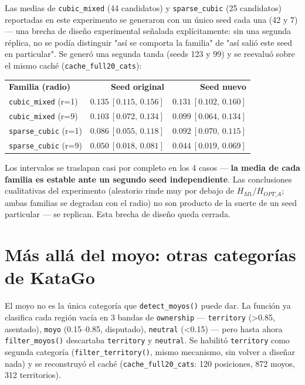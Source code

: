 \documentclass[11pt, a4paper]{article}
\newcommand{\TH}[1]{\cellcolor{cTHbg}\color{white}\textbf{#1}}
\begin{document}
Las medias de \texttt{cubic\_mixed} (44 candidatos) y
\texttt{sparse\_cubic} (25 candidatos) reportadas en este experimento
se generaron con un \'unico seed cada una (42 y 7) --- una brecha de
dise\~no experimental se\~nalada expl\'icitamente: sin una segunda
r\'eplica, no se pod\'ia distinguir "as\'i se comporta la familia" de
"as\'i sali\'o este seed en particular". Se gener\'o una segunda
tanda (seeds 123 y 99) y se reevalu\'o sobre el mismo cach\'e
(\texttt{cache\_full20\_cats}):

\medskip
\begin{center}
\begin{tabular}{lrr}
  \TH{Familia (radio)} & \TH{Seed original} & \TH{Seed nuevo} \\[1pt]
  \texttt{cubic\_mixed} (r=1)  & $0.135\ [0.115,\,0.156]$ & $0.131\ [0.102,\,0.160]$ \\
  \texttt{cubic\_mixed} (r=9)  & $0.103\ [0.072,\,0.134]$ & $0.099\ [0.064,\,0.134]$ \\
  \texttt{sparse\_cubic} (r=1) & $0.086\ [0.055,\,0.118]$ & $0.092\ [0.070,\,0.115]$ \\
  \texttt{sparse\_cubic} (r=9) & $0.050\ [0.018,\,0.081]$ & $0.044\ [0.019,\,0.069]$ \\
\end{tabular}
\end{center}
\medskip

\begin{tcolorbox}[quotebox]
  Los intervalos se traslapan casi por completo en los 4 casos ---
  \textbf{la media de cada familia es estable ante un segundo seed
  independiente}. Las conclusiones cualitativas del experimento
  (aleatorio rinde muy por debajo de $H_{M1}$/$H_{OPT\_A}$; ambas
  familias se degradan con el radio) no son producto de la suerte de
  un seed particular --- se replican. Esta brecha de dise\~no queda
  cerrada.
\end{tcolorbox}

\section{M\'as all\'a del moyo: otras categor\'ias de KataGo}
\label{sec:categorias}

El moyo no es la \'unica categor\'ia que \texttt{detect\_moyos()} puede
dar. La funci\'on ya clasifica cada regi\'on vac\'ia en 3 bandas de
\texttt{ownership} --- \texttt{territory} (>0.85, asentado),
\texttt{moyo} (0.15--0.85, disputado), \texttt{neutral} (<0.15) --- pero
hasta ahora \texttt{filter\_moyos()} descartaba \texttt{territory} y
\texttt{neutral}. Se habilit\'o \texttt{territory} como segunda
categor\'ia (\texttt{filter\_territory()}, mismo mecanismo, sin volver
a dise\~nar nada) y se reconstruy\'o el cach\'e
(\texttt{cache\_full20\_cats}: 120 posiciones, 872 moyos, 312
territorios).
\end{document}
